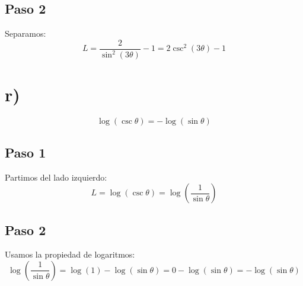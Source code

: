 \documentclass[12pt,a4paper]{article}
\begin{document}
\subsection*{Paso 2}
Separamos:
\[
L = \frac{2}{\sin^2(3\theta)} - 1 = 2\csc^2(3\theta) - 1
\]

\newpage
\section*{r)}

\begin{identidad}
\[
\log(\csc\theta)
=
-\log(\sin\theta)
\]
\end{identidad}

\subsection*{Paso 1}
Partimos del lado izquierdo:
\[
L = \log(\csc\theta) = \log\left(\frac{1}{\sin\theta}\right)
\]

\subsection*{Paso 2}
Usamos la propiedad de logaritmos:
\[
\log\left(\frac{1}{\sin\theta}\right) = \log(1) - \log(\sin\theta) = 0 - \log(\sin\theta) = -\log(\sin\theta)
\]
\end{document}
